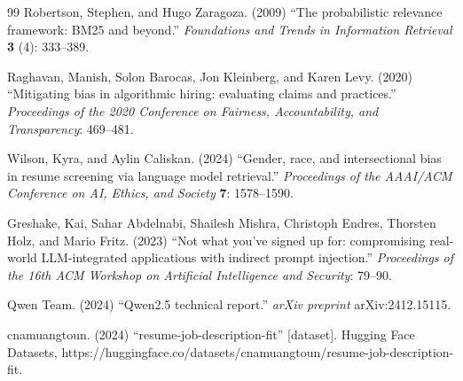 \documentclass[3p,times,procedia]{elsarticle}
\begin{document}
\begin{thebibliography}{99}
Robertson, Stephen, and Hugo Zaragoza. (2009) ``The probabilistic relevance framework: BM25 and beyond.'' {\it Foundations and Trends in Information Retrieval} {\bf 3} (4): 333--389.

Raghavan, Manish, Solon Barocas, Jon Kleinberg, and Karen Levy. (2020) ``Mitigating bias in algorithmic hiring: evaluating claims and practices.'' {\it Proceedings of the 2020 Conference on Fairness, Accountability, and Transparency}: 469--481.

Wilson, Kyra, and Aylin Caliskan. (2024) ``Gender, race, and intersectional bias in resume screening via language model retrieval.'' {\it Proceedings of the AAAI/ACM Conference on AI, Ethics, and Society} {\bf 7}: 1578--1590.

Greshake, Kai, Sahar Abdelnabi, Shailesh Mishra, Christoph Endres, Thorsten Holz, and Mario Fritz. (2023) ``Not what you've signed up for: compromising real-world LLM-integrated applications with indirect prompt injection.'' {\it Proceedings of the 16th ACM Workshop on Artificial Intelligence and Security}: 79--90.

Qwen Team. (2024) ``Qwen2.5 technical report.'' {\it arXiv preprint} arXiv:2412.15115.

cnamuangtoun. (2024) ``resume-job-description-fit'' [dataset]. Hugging Face Datasets, https://huggingface.co/datasets/cnamuangtoun/resume-job-description-fit.

\end{thebibliography}
\end{document}
